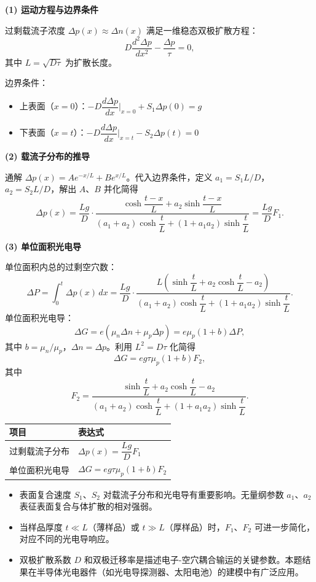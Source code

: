 \begin{derivationbox}[标准解题过程]
\textbf{(1) 运动方程与边界条件}

过剩载流子浓度 $\Delta p(x)\approx\Delta n(x)$ 满足一维稳态双极扩散方程：
\[
D\frac{d^2\Delta p}{dx^2}-\frac{\Delta p}{\tau}=0,
\]
其中 $L=\sqrt{D\tau}$ 为扩散长度。

边界条件：
\begin{itemize}
    \item 上表面（$x=0$）：$-D\dfrac{d\Delta p}{dx}\big|_{x=0}+S_1\Delta p(0)=g$
    \item 下表面（$x=t$）：$-D\dfrac{d\Delta p}{dx}\big|_{x=t}-S_2\Delta p(t)=0$
\end{itemize}

\textbf{(2) 载流子分布的推导}

通解 $\Delta p(x)=Ae^{-x/L}+Be^{x/L}$。代入边界条件，定义 $a_1=S_1L/D$，$a_2=S_2L/D$，解出 $A$、$B$ 并化简得
\[
\Delta p(x)=\frac{Lg}{D}\cdot\frac{\cosh\dfrac{t-x}{L}+a_2\sinh\dfrac{t-x}{L}}{(a_1+a_2)\cosh\dfrac{t}{L}+(1+a_1a_2)\sinh\dfrac{t}{L}}=\frac{Lg}{D}F_1.
\]

\textbf{(3) 单位面积光电导}

单位面积内总的过剩空穴数：
\[
\Delta P=\int_0^t\Delta p(x)\,dx=\frac{Lg}{D}\cdot\frac{L\left(\sinh\dfrac{t}{L}+a_2\cosh\dfrac{t}{L}-a_2\right)}{(a_1+a_2)\cosh\dfrac{t}{L}+(1+a_1a_2)\sinh\dfrac{t}{L}}.
\]
单位面积光电导：
\[
\Delta G=e(\mu_n\Delta n+\mu_p\Delta p)=e\mu_p(1+b)\Delta P,
\]
其中 $b=\mu_n/\mu_p$，$\Delta n=\Delta p$。利用 $L^2=D\tau$ 化简得
\begin{equation}
\boxed{\Delta G=eg\tau\mu_p(1+b)F_2,}
\end{equation}
其中
\[
F_2=\frac{\sinh\dfrac{t}{L}+a_2\cosh\dfrac{t}{L}-a_2}{(a_1+a_2)\cosh\dfrac{t}{L}+(1+a_1a_2)\sinh\dfrac{t}{L}}.
\]
\end{derivationbox}

\begin{formulabox}[答案汇总]
\begin{center}
\begin{tabular}{ll}
\toprule
\textbf{项目} & \textbf{表达式} \\
\midrule
过剩载流子分布 & $\Delta p(x)=\dfrac{Lg}{D}F_1$ \\
单位面积光电导 & $\Delta G=eg\tau\mu_p(1+b)F_2$ \\
\bottomrule
\end{tabular}
\end{center}
\end{formulabox}

\begin{insightbox}[物理图像]
\begin{itemize}
    \item 表面复合速度 $S_1$、$S_2$ 对载流子分布和光电导有重要影响。无量纲参数 $a_1$、$a_2$ 表征表面复合与体扩散的相对强弱。
    \item 当样品厚度 $t\ll L$（薄样品）或 $t\gg L$（厚样品）时，$F_1$、$F_2$ 可进一步简化，对应不同的光电导响应。
    \item 双极扩散系数 $D$ 和双极迁移率是描述电子-空穴耦合输运的关键参数。本题结果在半导体光电器件（如光电导探测器、太阳电池）的建模中有广泛应用。
\end{itemize}
\end{insightbox}
